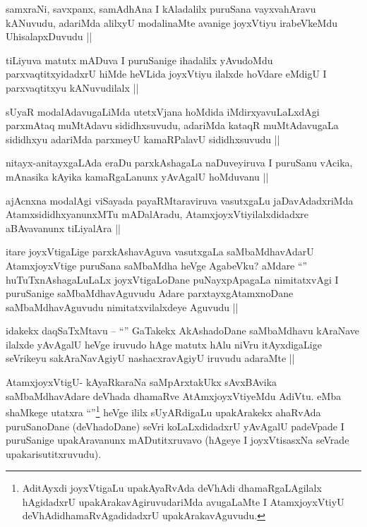 \begin{artha}
samxraNi, savxpanx, samAdhAna I kAladalilx puruSana vayxvahAravu kANuvudu, adariMda alilxyU modalinaMte avanige joyxVtiyu irabeVkeMdu UhisalapxDuvudu ||
\end{artha}

\begin{artha}
tiLiyuva matutx mADuva I puruSanige ihadalilx yAvudoMdu parxvaqtitxyidadxrU hiMde heVLida joyxVtiyu ilalxde hoVdare eMdigU I parxvaqtitxyu kANuvudilalx ||
\end{artha}

\begin{artha}
sUyaR modalAdavugaLiMda utetxVjana hoMdida iMdirxyavuLaLxdAgi parxmAtaq muMtAdavu sididhxsuvudu, adariMda kataqR muMtAdavugaLa sididhxyu adariMda parxmeyU kamaRPalavU sididhxsuvudu ||
\end{artha}

\begin{artha}
nitayx-anitayxgaLAda eraDu parxkAshagaLa naDuveyiruva I puruSanu vAcika, mAnasika kAyika kamaRgaLanunx yAvAgalU hoMduvanu ||
\end{artha}

\begin{artha}
ajAcnxna modalAgi viSayada payaRMtaraviruva vasutxgaLu jaDavAdadxriMda AtamxsididhxyanunxMTu mADalAradu, AtamxjoyxVtiyilalxdidadxre aBAvavanunx tiLiyalAra ||
\end{artha}

\begin{artha}
itare joyxVtigaLige parxkAshavAguva vasutxgaLa saMbaMdhavAdarU AtamxjoyxVtige puruSana saMbaMdha heVge AgabeVku? aMdare ``\stext'' huTuTxnAshagaLuLaLx joyxVtigaLoDane puNayxpApagaLa nimitatxvAgi I puruSanige saMbaMdhavAguvudu Adare parxtayxgAtamxnoDane saMbaMdhavAguvudu nimitatxvilalxdeye Aguvudu ||
\end{artha}

\begin{artha}
idakekx daqSaTxMtavu -- ``\stext'' GaTakekx AkAshadoDane saMbaMdhavu kAraNave ilalxde yAvAgalU heVge iruvudo hAge matutx hAlu niVru itAyxdigaLige seVrikeyu sakAraNavAgiyU nashacxravAgiyU iruvudu adaraMte ||
\end{artha}

\begin{artha}
AtamxjoyxVtigU- kAyaRkaraNa saMpArxtakUkx sAvxBAvika saMbaMdhavAdare deVhada dhamaRve AtAmxjoyxVtiyeMdu AdiVtu. eMba shaMkege utatxra ``\stext''\footnote[1]{AditAyxdi joyxVtigaLu upakAyaRvAda deVhAdi dhamaRgaLAgilalx hAgidadxrU upakArakavAgiruvudariMda avugaLaMte I AtamxjoyxVtiyU deVhAdidhamaRvAgadidadxrU upakArakavAguvudu.} heVge ililx sUyARdigaLu upakArakekx ahaRvAda puruSanoDane (deVhadoDane) seVri koLaLxdidadxrU yAvAgalU padeVpade I puruSanige upakAravanunx mADutitxruvavo (hAgeye I joyxVtisasxNa seVrade upakarisutitxruvudu).
\end{artha}

